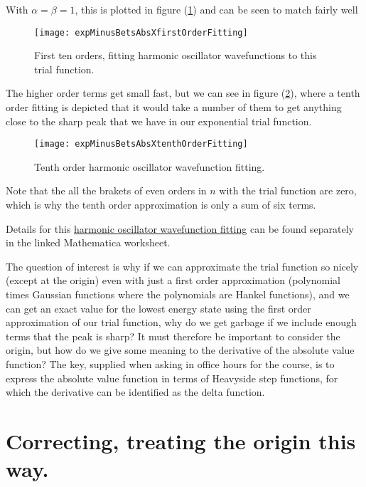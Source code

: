 With $\alpha = \beta = 1$, this is plotted in figure (\ref{fig:expMinusBetsAbsXfirstOrderFitting}) and can be seen to match fairly well

\begin{figure}[htp]
\centering
\texttt{[image: expMinusBetsAbsXfirstOrderFitting]}
\caption{First ten orders, fitting harmonic oscillator wavefunctions to this trial function.}\label{fig:expMinusBetsAbsXfirstOrderFitting}
\end{figure}

The higher order terms get small fast, but we can see in figure (\ref{fig:expMinusBetsAbsXtenthOrderFitting}), where a tenth order fitting is depicted that it would take a number of them to get anything close to the sharp peak that we have in our exponential trial function.

\begin{figure}[htp]
\centering
\texttt{[image: expMinusBetsAbsXtenthOrderFitting]}
\caption{Tenth order harmonic oscillator wavefunction fitting.}\label{fig:expMinusBetsAbsXtenthOrderFitting}
\end{figure}

Note that the all the brakets of even orders in $n$ with the trial function are zero, which is why the tenth order approximation is only a sum of six terms.

Details for this \href{https://github.com/peeterjoot/physicsplay/blob/master/notes/phy456/gaussian\%20fitting\%20for\%20abs\%20function.nb}{harmonic oscillator wavefunction fitting} can be found separately in the linked Mathematica worksheet.

The question of interest is why if we can approximate the trial function so nicely (except at the origin) even with just a first order approximation (polynomial times Gaussian functions where the polynomials are Hankel functions), and we can get an exact value for the lowest energy state using the first order approximation of our trial function, why do we get garbage if we include enough terms that the peak is sharp?  It must therefore be important to consider the origin, but how do we give some meaning to the derivative of the absolute value function?  The key, supplied when asking in office hours for the course, is to express the absolute value function in terms of Heavyside step functions, for which the derivative can be identified as the delta function.

\section{Correcting, treating the origin this way.}

